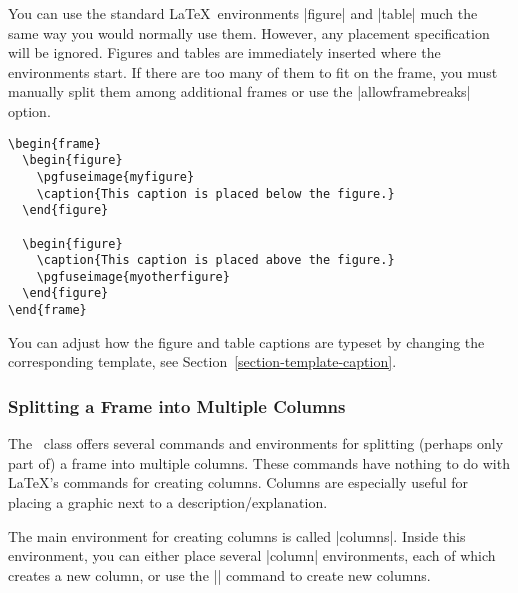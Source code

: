 You can use the standard \LaTeX\ environments |figure| and
|table| much the same way you would normally use them. However,
any placement specification will be ignored. Figures and tables are
immediately inserted where the environments start. If there are too
many of them to fit on the frame, you must manually split them among
additional frames or use the |allowframebreaks| option.

\example
\begin{verbatim}
\begin{frame}
  \begin{figure}
    \pgfuseimage{myfigure}
    \caption{This caption is placed below the figure.}
  \end{figure}

  \begin{figure}
    \caption{This caption is placed above the figure.}
    \pgfuseimage{myotherfigure}
  \end{figure}
\end{frame}
\end{verbatim}

You can adjust how the figure and table captions are typeset by
changing the corresponding template, see
Section~\ref{section-template-caption}. 





\subsubsection{Splitting a Frame into Multiple Columns}

The \beamer\ class offers several commands and environments for
splitting (perhaps only part of) a frame into multiple columns. These
commands have nothing to do with \LaTeX's commands for creating
columns. Columns are especially useful for placing a graphic next to a
description/explanation.

The main environment for creating columns is called |columns|. Inside
this environment, you can either place several |column| environments,
each of which creates a new column, or use the |\column| command to
create new columns.

